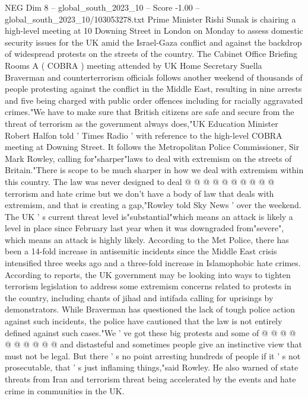 \begin{textsample}{NEG Dim 8 – global\_south\_2023\_10 – Score -1.00 – global\_south\_2023\_10/103053278.txt}  \label{ex:f8_neg_092}
Prime Minister Rishi Sunak is chairing a high-level meeting at 10 Downing Street in London on Monday to assess domestic security issues for the UK amid the Israel-Gaza conflict and against the backdrop of widespread protests on the streets of the country.
The Cabinet Office Briefing Rooms A ( COBRA ) meeting attended by UK Home Secretary Suella Braverman and counterterrorism officials follows another weekend of thousands of people protesting against the conflict in the Middle East, resulting in nine arrests and five being charged with public order offences including for racially aggravated crimes."We have to make sure that British citizens are safe and secure from the threat of terrorism as the government always does,"UK Education Minister Robert Halfon told ' Times Radio ' with reference to the high-level COBRA meeting at Downing Street.
It follows the Metropolitan Police Commissioner, Sir Mark Rowley, calling for"sharper"laws to deal with extremism on the streets of Britain."There is scope to be much sharper in how we deal with extremism within this country.
The law was never designed to deal @ @ @ @ @ @ @ @ @ @ terrorism and hate crime but we don't have a body of law that deals with extremism, and that is creating a gap,"Rowley told Sky News ' over the weekend.
The UK ' s current threat level is"substantial"which means an attack is likely a level in place since February last year when it was downgraded from"severe", which means an attack is highly likely.
According to the Met Police, there has been a 14-fold increase in antisemitic incidents since the Middle East crisis intensified three weeks ago and a three-fold increase in Islamophobic hate crimes.
According to reports, the UK government may be looking into ways to tighten terrorism legislation to address some extremism concerns related to protests in the country, including chants of jihad and intifada calling for uprisings by demonstrators.
While Braverman has questioned the lack of tough police action against such incidents, the police have cautioned that the law is not entirely defined against such cases."We ' ve got these big protests and some of @ @ @ @ @ @ @ @ @ @ and distasteful and sometimes people give an instinctive view that must not be legal.
But there ' s no point arresting hundreds of people if it ' s not prosecutable, that ' s just inflaming things,"said Rowley.
He also warned of state threats from Iran and terrorism threat being accelerated by the events and hate crime in communities in the UK.

\end{textsample}
